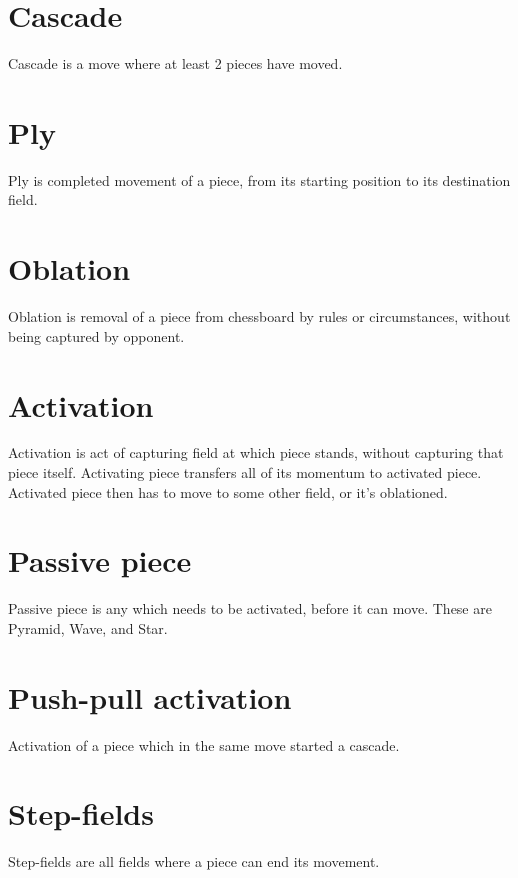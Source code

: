 \section*{Cascade}
\label{sec:Terms/Cascade}
Cascade is a move where at least 2 pieces have moved.

\section*{Ply}
\label{sec:Terms/Ply}
Ply is completed movement of a piece, from its starting position to its destination
field.

\section*{Oblation}
\label{sec:Terms/Oblation}
Oblation is removal of a piece from chessboard by rules or circumstances,
without being captured by opponent.

\section*{Activation}
\label{sec:Terms/Activation}
Activation is act of capturing field at which piece stands, without capturing that
piece itself. Activating piece transfers all of its momentum to activated piece.
Activated piece then has to move to some other field, or it's oblationed.

\section*{Passive piece}
\label{sec:Terms/Passive piece}
Passive piece is any which needs to be activated, before it can move.
These are Pyramid, Wave, and Star.

\section*{Push-pull activation}
\label{sec:Terms/Push-pull activation}
Activation of a piece which in the same move started a cascade.

\section*{Step-fields}
\label{sec:Terms/Step-fields}
Step-fields are all fields where a piece can end its movement.


